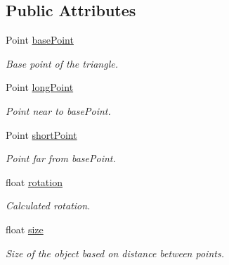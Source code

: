 \subsection*{\-Public \-Attributes}
\begin{DoxyCompactItemize}
\item 
\hypertarget{classSceneObject_a2b8c4779bd48231183257d0470c32f67}{\-Point \hyperlink{classSceneObject_a2b8c4779bd48231183257d0470c32f67}{base\-Point}}\label{classSceneObject_a2b8c4779bd48231183257d0470c32f67}

\begin{DoxyCompactList}\small\item\em \-Base point of the triangle. \end{DoxyCompactList}\item 
\hypertarget{classSceneObject_a78c848200dc2f5baa59393547e6f7259}{\-Point \hyperlink{classSceneObject_a78c848200dc2f5baa59393547e6f7259}{long\-Point}}\label{classSceneObject_a78c848200dc2f5baa59393547e6f7259}

\begin{DoxyCompactList}\small\item\em \-Point near to base\-Point. \end{DoxyCompactList}\item 
\hypertarget{classSceneObject_a11385bdb16c8fe6136484078bee1fb61}{\-Point \hyperlink{classSceneObject_a11385bdb16c8fe6136484078bee1fb61}{short\-Point}}\label{classSceneObject_a11385bdb16c8fe6136484078bee1fb61}

\begin{DoxyCompactList}\small\item\em \-Point far from base\-Point. \end{DoxyCompactList}\item 
\hypertarget{classSceneObject_a48d8fc075acf0e2c86bb7168fa3af4a8}{float \hyperlink{classSceneObject_a48d8fc075acf0e2c86bb7168fa3af4a8}{rotation}}\label{classSceneObject_a48d8fc075acf0e2c86bb7168fa3af4a8}

\begin{DoxyCompactList}\small\item\em \-Calculated rotation. \end{DoxyCompactList}\item 
\hypertarget{classSceneObject_ab3592bd76e316b0d5be799f6b86b6757}{float \hyperlink{classSceneObject_ab3592bd76e316b0d5be799f6b86b6757}{size}}\label{classSceneObject_ab3592bd76e316b0d5be799f6b86b6757}

\begin{DoxyCompactList}\small\item\em \-Size of the object based on distance between points. \end{DoxyCompactList}\end{DoxyCompactItemize}


